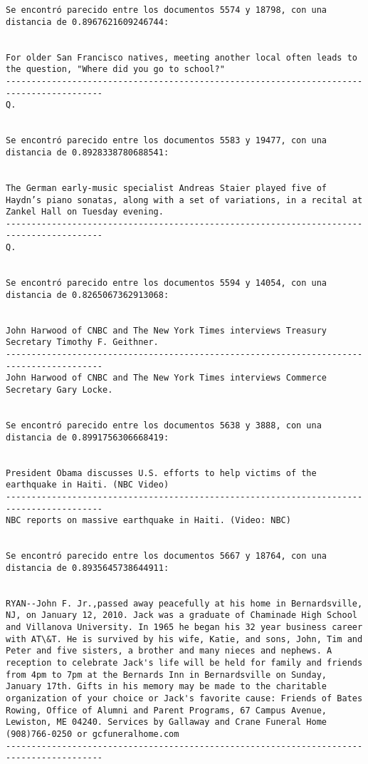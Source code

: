 \documentclass[11pt]{article}
\begin{document}
\begin{Verbatim}[commandchars=\\\{\}]
Se encontró parecido entre los documentos 5574 y 18798, con una distancia de 0.8967621609246744:


For older San Francisco natives, meeting another local often leads to the question, "Where did you go to school?"
-----------------------------------------------------------------------------------------
Q.


Se encontró parecido entre los documentos 5583 y 19477, con una distancia de 0.8928338780688541:


The German early-music specialist Andreas Staier played five of Haydn’s piano sonatas, along with a set of variations, in a recital at Zankel Hall on Tuesday evening.
-----------------------------------------------------------------------------------------
Q.


Se encontró parecido entre los documentos 5594 y 14054, con una distancia de 0.8265067362913068:


John Harwood of CNBC and The New York Times interviews Treasury Secretary Timothy F. Geithner.
-----------------------------------------------------------------------------------------
John Harwood of CNBC and The New York Times interviews Commerce Secretary Gary Locke.


Se encontró parecido entre los documentos 5638 y 3888, con una distancia de 0.8991756306668419:


President Obama discusses U.S. efforts to help victims of the earthquake in Haiti. (NBC Video)
-----------------------------------------------------------------------------------------
NBC reports on massive earthquake in Haiti. (Video: NBC)


Se encontró parecido entre los documentos 5667 y 18764, con una distancia de 0.8935645738644911:


RYAN--John F. Jr.,passed away peacefully at his home in Bernardsville, NJ, on January 12, 2010. Jack was a graduate of Chaminade High School and Villanova University. In 1965 he began his 32 year business career with AT\&T. He is survived by his wife, Katie, and sons, John, Tim and Peter and five sisters, a brother and many nieces and nephews. A reception to celebrate Jack's life will be held for family and friends from 4pm to 7pm at the Bernards Inn in Bernardsville on Sunday, January 17th. Gifts in his memory may be made to the charitable organization of your choice or Jack's favorite cause: Friends of Bates Rowing, Office of Alumni and Parent Programs, 67 Campus Avenue, Lewiston, ME 04240. Services by Gallaway and Crane Funeral Home (908)766-0250 or gcfuneralhome.com
-----------------------------------------------------------------------------------------




\end{Verbatim}
\end{document}
